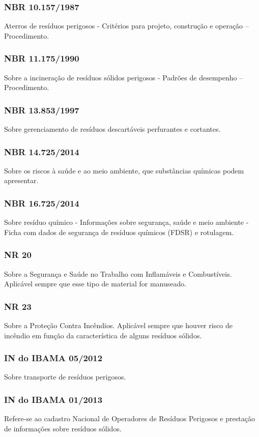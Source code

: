 \begin{subapend}
\begin{subsubapend}
		\subsubsection{NBR 10.157/1987}
		Aterros de resíduos perigosos - Critérios para projeto, construção e operação – Procedimento.
		\subsubsection{NBR 11.175/1990}
		Sobre a incineração de resíduos sólidos perigosos - Padrões de desempenho – Procedimento.
		\subsubsection{NBR 13.853/1997}
		Sobre gerenciamento de resíduos descartáveis perfurantes e cortantes.
		\subsubsection{NBR 14.725/2014}
		Sobre os riscos à saúde e ao meio ambiente, que substâncias químicas podem apresentar.
		\subsubsection{NBR 16.725/2014}
		Sobre resíduo químico - Informações sobre segurança, saúde e meio ambiente - Ficha com dados de segurança de resíduos químicos (FDSR) e rotulagem.
		\subsubsection{NR 20}
		Sobre a Segurança e Saúde no Trabalho com Inflamáveis e Combustíveis. Aplicável sempre que esse tipo de material for manuseado.
		\subsubsection{NR 23}
		Sobre a Proteção Contra Incêndios. Aplicável sempre que houver risco de incêndio em função da característica de alguns resíduos sólidos.
		\subsubsection{IN do IBAMA 05/2012}
		Sobre transporte de resíduos perigosos.
		\subsubsection{IN do IBAMA 01/2013}
		Refere-se ao cadastro Nacional de Operadores de Resíduos Perigosos e prestação de informações sobre resíduos sólidos.
	\end{subsubapend}
\end{subapend}

